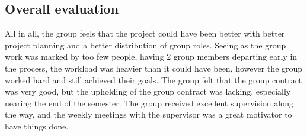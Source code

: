 \subsection{Overall evaluation}

All in all, the group feels that the project could have been better with better project planning and a better distribution of group roles. Seeing as the group work was marked by too few people, having 2 group members departing early in the process, the workload was heavier than it could have been, however the group worked hard and still achieved their goals.
\vspace{10pt}
The group felt that the group contract was very good, but the upholding of the group contract was lacking, especially nearing the end of the semester. The group received excellent supervision along the way, and the weekly meetings with the supervisor was a great motivator to have things done.
